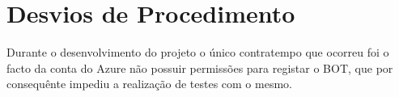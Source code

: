 \chapter{Desvios de Procedimento}
\label{cap:detour}


Durante o desenvolvimento do projeto o único contratempo que ocorreu foi o facto da conta
do Azure não possuir permissões para registar o BOT, que por consequênte impediu a realização
de testes com o mesmo.

